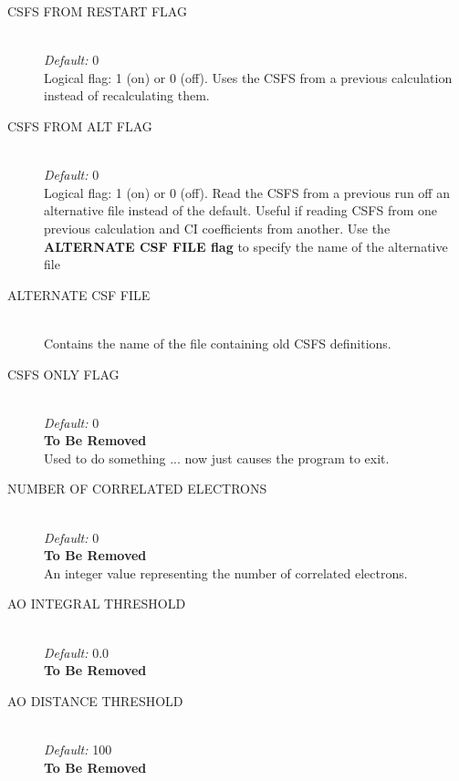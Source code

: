 \documentclass{article}
\begin{document}
\begin{description}
        \item[CSFS FROM RESTART FLAG] \hfill \\
        \emph{Default:} 0 \hfill \\
         Logical flag: 1 (on) or 0 (off). Uses the CSFS from a previous calculation instead of recalculating them.
        
        \item[CSFS FROM ALT FLAG] \hfill \\
        \emph{Default:} 0 \hfill \\
        Logical flag: 1 (on) or 0 (off). Read the CSFS from a previous run off an alternative file instead of the default. Useful if reading CSFS from one previous calculation and CI coefficients from another. Use the \textbf{ALTERNATE CSF FILE flag} to specify the name of the alternative file
       
         \item[ALTERNATE CSF FILE] \hfill \\ 
         Contains the name of the file containing old CSFS definitions.

        \item[CSFS ONLY FLAG] \hfill \\
        \emph{Default:} 0 \hfill \\
        \textbf{To Be Removed} \hfill \\
        Used to do something ... now just causes the program to exit.
        
        \item[NUMBER OF CORRELATED ELECTRONS] \hfill \\
        \emph{Default:} 0 \hfill \\
        \textbf{To Be Removed} \hfill \\
        An integer value representing the number of correlated electrons.
        
        \item[AO INTEGRAL THRESHOLD] \hfill \\
        \emph{Default:} $0.0$ \hfill \\
        \textbf{To Be Removed}
        
        \item[AO DISTANCE THRESHOLD] \hfill \\
        \emph{Default: } 100 \hfill \\
        \textbf{To Be Removed}
        

\end{description}
\end{document}
